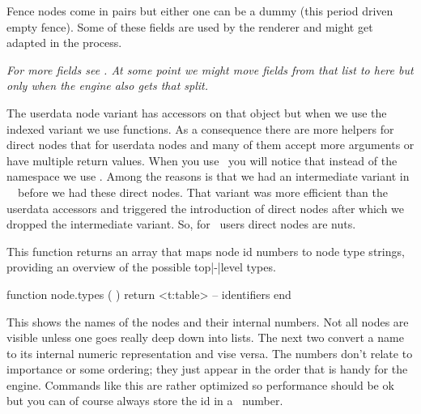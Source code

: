 
\stopsubsection

\startsubsection[title={fence}]

Fence nodes come in pairs but either one can be a dummy (this period driven empty
fence). Some of these fields are used by the renderer and might get adapted in
the process.


{\em For more fields see . At some point we might move fields from
that list to here but only when the engine also gets that split.}


\stopsubsection

\stopsection

\startsection[title=Helpers]

\startsubsection[title={Introduction}]

The userdata node variant has accessors on that object but when we use the
indexed variant we use functions. As a consequence there are more helpers for
direct nodes that for userdata nodes and many of them accept more arguments or
have multiple return values. When you use \CONTEXT\ you will notice that instead
of the  namespace we use . Among the reasons is
that we had an intermediate variant in \CONTEXT\ \MKIV\ before we had these
direct nodes. That variant was more efficient than the userdata accessors and
triggered the introduction of direct nodes after which we dropped the
intermediate variant. So, for \CONTEXT\ users direct nodes are nuts.

\stopsubsection

\startsubsection[title={Housekeeping}]

This function returns an array that maps node id numbers to node type strings,
providing an overview of the possible top|-|level  types.

\starttyping[option=LUA]
function node.types ( )
    return <t:table> -- identifiers
end
\stoptyping

This shows the names of the nodes and their internal numbers. Not all nodes are
visible unless one goes really deep down into lists. The next two convert a name
to its internal numeric representation and vise versa. The numbers don't relate
to importance or some ordering; they just appear in the order that is handy for
the engine. Commands like this are rather optimized so performance should be ok
but you can of course always store the id in a \LUA\ number.


